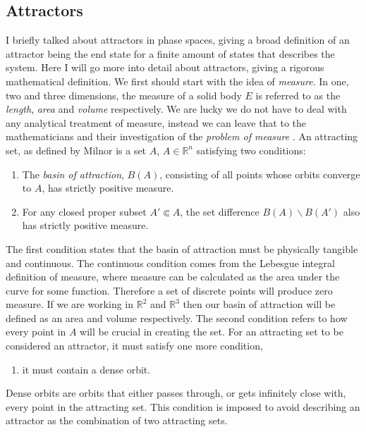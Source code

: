 \documentclass[aps,prl,reprint,10pt,amsmath,amssymb,superscriptaddress,a4paper]{revtex4-2}
\begin{document}
\subsection{Attractors}
I briefly talked about attractors in phase spaces, giving a broad definition of an attractor being the end state for a finite amount of states that describes the system. Here 
I will go more into detail about attractors, giving a rigorous mathematical definition. We first should start with the idea of \textit{measure}. In one, two and three dimensions, 
the measure of a solid body $E$ is referred to as the \textit{length}, \textit{area} and \textit{volume} respectively. We are lucky we do not have to deal with any analytical 
treatment of measure, instead we can leave that to the mathematicians and their investigation of the \textit{problem of measure} \citep{tao}. An attracting set, as defined by Milnor
\citep{milnor} is a set $A$, $A \in \mathbb{R}^n$ satisfying two conditions:

\begin{enumerate}
    \item The \textit{basin of attraction}, $B(A)$, consisting of all points whose orbits converge to $A$, has strictly positive measure.
    \item For any closed proper subset $A'\Subset A$, the set difference $B(A) \backslash B(A')$ also has strictly positive measure.
\end{enumerate}

The first condition states that the basin of attraction must be physically tangible and continuous. The continuous condition comes from the Lebesgue integral definition of measure, 
where measure can be calculated as the area under the curve for some function. Therefore a set of discrete points will produce zero measure. If we are working in $\mathbb{R}^2$ and 
$\mathbb{R}^3$ then our basin of attraction will be defined as an area and volume respectively. The second condition refers to how every point in $A$ will be crucial in creating the 
set. For an attracting set to be considered an attractor, it must satisfy one more condition,

\begin{enumerate}
    \item it must contain a dense orbit.
\end{enumerate}

Dense orbits are orbits that either passes through, or gets infinitely close with, every point in the attracting set. This condition is imposed to avoid describing an attractor as the 
combination of two attracting sets.
\end{document}
